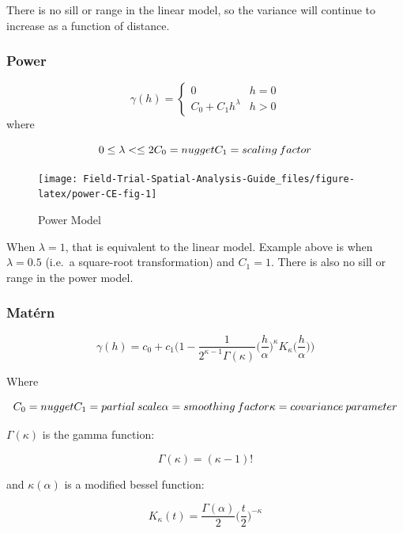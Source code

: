 \documentclass[
]{book}
\begin{document}
There is no sill or range in the linear model, so the variance will continue to increase as a function of distance.

\hypertarget{power}{%
\subsubsection{Power}\label{power}}

\[ \gamma (h)=\left\{ {\begin{array}{cc} 0 & h = 0\\ C_0+C_1h^\lambda & h > 0 \end{array} } \right. \]
where

\[ 0 \leq \lambda <\leq 2 \\ C_0 = nugget \\ C_1 = scaling \: factor \]

\begin{figure}

{\centering \texttt{[image: Field-Trial-Spatial-Analysis-Guide\_files/figure-latex/power-CE-fig-1]} 

}

\caption{Power Model}\label{fig:power-CE-fig}
\end{figure}

When \(\lambda = 1\), that is equivalent to the linear model. Example above is when \(\lambda = 0.5\) (i.e.~a square-root transformation) and \(C_1 = 1\). There is also no sill or range in the power model.

\hypertarget{matuxe9rn}{%
\subsubsection{Matérn}\label{matuxe9rn}}

\[\gamma(h) = c_0 + c_1 \bigg( 1- \frac{1}{2^{\kappa -1}\Gamma(\kappa)}
\Big( \frac{h}{\alpha} \Big) ^{\kappa} K_\kappa
\Big( \frac{h}{\alpha} \Big) \bigg)\]

Where

\[ C_0 = nugget \\ C_1 = partial \: scale \\ 
\alpha = smoothing \: factor \\ \kappa = covariance \: parameter
\]

\(\Gamma(\kappa)\) is the gamma function:

\[\Gamma(\kappa) = (\kappa -1)!\]

and \(\kappa(\alpha)\) is a modified bessel function:

\[ K_\kappa(t) = \frac{\Gamma(\alpha)}{2} \big( \frac{t}{2} \big) ^{-\kappa}\]
\end{document}
